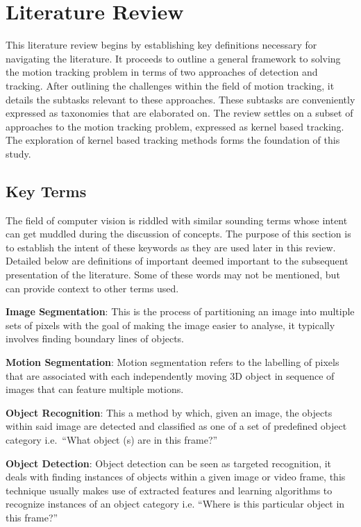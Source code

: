 \chapter{Literature Review}\label{chapter_literature_review}
This literature review begins by establishing key definitions necessary for
navigating the literature.
It proceeds to outline a general framework to solving the motion tracking
problem in terms of two approaches of detection and tracking. After outlining
the challenges within the field of motion tracking, it details
the subtasks relevant to these approaches. These subtasks are conveniently expressed as
taxonomies that are elaborated on. The review settles on a subset of approaches
to the motion tracking problem, expressed as kernel based tracking. The
exploration of kernel based tracking methods forms the foundation of this study.

\section{Key Terms}
The field of computer vision is riddled with similar sounding terms whose intent
can get muddled during the discussion of concepts. The purpose of this section
is to establish the intent of these keywords as they are used later in this
review. Detailed below are definitions of important deemed important to the
subsequent presentation of the literature. Some of these words may not be
mentioned, but can provide
context to other terms used.

\textbf{Image Segmentation}: This is the process of partitioning an image into multiple
sets of pixels with the goal of making the image easier to analyse, it typically
involves finding boundary lines of objects. 

\textbf{Motion Segmentation}: Motion segmentation refers to the labelling of pixels that
are associated with each independently moving 3D object in sequence of images
that can feature multiple motions.~\cite{Tekalp2014}

\textbf{Object Recognition}: This a method by which, given an image, the objects within
said image are detected and classified as one of a set of predefined object
category i.e.\ ``What object (s) are in this frame?''

\textbf{Object Detection}: Object detection can be seen as targeted recognition, it deals
with finding instances of objects within a given image or video frame, this
technique usually makes use of extracted features and learning algorithms to
recognize instances of an object category i.e. ``Where is this particular
object in this frame?''

